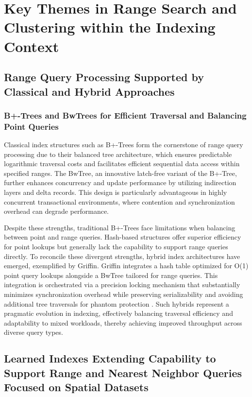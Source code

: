 \documentclass[sigconf]{acmart}
\begin{document}
\section{Key Themes in Range Search and Clustering within the Indexing Context}

\subsection{Range Query Processing Supported by Classical and Hybrid Approaches}

\subsubsection{B+-Trees and BwTrees for Efficient Traversal and Balancing Point Queries}

Classical index structures such as B+-Trees form the cornerstone of range query processing due to their balanced tree architecture, which ensures predictable logarithmic traversal costs and facilitates efficient sequential data access within specified ranges. The BwTree, an innovative latch-free variant of the B+-Tree, further enhances concurrency and update performance by utilizing indirection layers and delta records. This design is particularly advantageous in highly concurrent transactional environments, where contention and synchronization overhead can degrade performance.

Despite these strengths, traditional B+-Trees face limitations when balancing between point and range queries. Hash-based structures offer superior efficiency for point lookups but generally lack the capability to support range queries directly. To reconcile these divergent strengths, hybrid index architectures have emerged, exemplified by Griffin. Griffin integrates a hash table optimized for O(1) point query lookups alongside a BwTree tailored for range queries. This integration is orchestrated via a precision locking mechanism that substantially minimizes synchronization overhead while preserving serializability and avoiding additional tree traversals for phantom protection \cite{ref31}. Such hybrids represent a pragmatic evolution in indexing, effectively balancing traversal efficiency and adaptability to mixed workloads, thereby achieving improved throughput across diverse query types.

\subsection{Learned Indexes Extending Capability to Support Range and Nearest Neighbor Queries Focused on Spatial Datasets}
\end{document}
